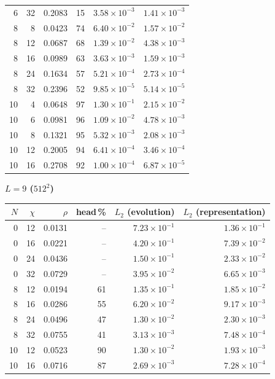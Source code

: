 {\begin{tabular}{rrrrrr}
6 & 32 & 0.2083 & 15 & $3.58\times10^{-3}$ & $1.41\times10^{-3}$\\
8 & 8 & 0.0423 & 74 & $6.40\times10^{-2}$ & $1.57\times10^{-2}$\\
8 & 12 & 0.0687 & 68 & $1.39\times10^{-2}$ & $4.38\times10^{-3}$\\
8 & 16 & 0.0989 & 63 & $3.63\times10^{-3}$ & $1.59\times10^{-3}$\\
8 & 24 & 0.1634 & 57 & $5.21\times10^{-4}$ & $2.73\times10^{-4}$\\
8 & 32 & 0.2396 & 52 & $9.85\times10^{-5}$ & $5.14\times10^{-5}$\\
10 & 4 & 0.0648 & 97 & $1.30\times10^{-1}$ & $2.15\times10^{-2}$\\
10 & 6 & 0.0981 & 96 & $1.09\times10^{-2}$ & $4.78\times10^{-3}$\\
10 & 8 & 0.1321 & 95 & $5.32\times10^{-3}$ & $2.08\times10^{-3}$\\
10 & 12 & 0.2005 & 94 & $6.41\times10^{-4}$ & $3.46\times10^{-4}$\\
10 & 16 & 0.2708 & 92 & $1.00\times10^{-4}$ & $6.87\times10^{-5}$\\
\bottomrule
\end{tabular}
\vspace{6pt}
\textbf{$L=9$ ($512^2$)}\\[2pt]
\begin{tabular}{rrrrrr}
\toprule
$N$ & $\chi$ & $\rho$ & head\,\% & $L_2$ (evolution) & $L_2$ (representation)\\
\midrule
0 & 12 & 0.0131 & -- & $7.23\times10^{-1}$ & $1.36\times10^{-1}$\\
0 & 16 & 0.0221 & -- & $4.20\times10^{-1}$ & $7.39\times10^{-2}$\\
0 & 24 & 0.0436 & -- & $1.50\times10^{-1}$ & $2.33\times10^{-2}$\\
0 & 32 & 0.0729 & -- & $3.95\times10^{-2}$ & $6.65\times10^{-3}$\\
8 & 12 & 0.0194 & 61 & $1.35\times10^{-1}$ & $1.85\times10^{-2}$\\
8 & 16 & 0.0286 & 55 & $6.20\times10^{-2}$ & $9.17\times10^{-3}$\\
8 & 24 & 0.0496 & 47 & $1.30\times10^{-2}$ & $2.30\times10^{-3}$\\
8 & 32 & 0.0755 & 41 & $3.13\times10^{-3}$ & $7.48\times10^{-4}$\\
10 & 12 & 0.0523 & 90 & $1.30\times10^{-2}$ & $1.93\times10^{-3}$\\
10 & 16 & 0.0716 & 87 & $2.69\times10^{-3}$ & $7.28\times10^{-4}$\\

\end{tabular}}
